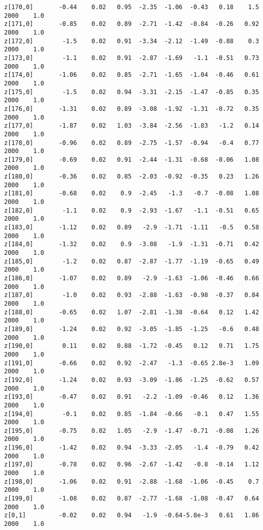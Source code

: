 \documentclass[11pt]{article}
\begin{document}
\begin{Verbatim}[commandchars=\\\{\}]
z[170,0]       -0.44    0.02   0.95  -2.35  -1.06  -0.43   0.18    1.5   2000    1.0
z[171,0]       -0.85    0.02   0.89  -2.71  -1.42  -0.84  -0.26   0.92   2000    1.0
z[172,0]        -1.5    0.02   0.91  -3.34  -2.12  -1.49  -0.88    0.3   2000    1.0
z[173,0]        -1.1    0.02   0.91  -2.87  -1.69   -1.1  -0.51   0.73   2000    1.0
z[174,0]       -1.06    0.02   0.85  -2.71  -1.65  -1.04  -0.46   0.61   2000    1.0
z[175,0]        -1.5    0.02   0.94  -3.31  -2.15  -1.47  -0.85   0.35   2000    1.0
z[176,0]       -1.31    0.02   0.89  -3.08  -1.92  -1.31  -0.72   0.35   2000    1.0
z[177,0]       -1.87    0.02   1.03  -3.84  -2.56  -1.83   -1.2   0.14   2000    1.0
z[178,0]       -0.96    0.02   0.89  -2.75  -1.57  -0.94   -0.4   0.77   2000    1.0
z[179,0]       -0.69    0.02   0.91  -2.44  -1.31  -0.68  -0.06   1.08   2000    1.0
z[180,0]       -0.36    0.02   0.85  -2.03  -0.92  -0.35   0.23   1.26   2000    1.0
z[181,0]       -0.68    0.02    0.9  -2.45   -1.3   -0.7  -0.08   1.08   2000    1.0
z[182,0]        -1.1    0.02    0.9  -2.93  -1.67   -1.1  -0.51   0.65   2000    1.0
z[183,0]       -1.12    0.02   0.89   -2.9  -1.71  -1.11   -0.5   0.58   2000    1.0
z[184,0]       -1.32    0.02    0.9  -3.08   -1.9  -1.31  -0.71   0.42   2000    1.0
z[185,0]        -1.2    0.02   0.87  -2.87  -1.77  -1.19  -0.65   0.49   2000    1.0
z[186,0]       -1.07    0.02   0.89   -2.9  -1.63  -1.06  -0.46   0.66   2000    1.0
z[187,0]        -1.0    0.02   0.93  -2.88  -1.63  -0.98  -0.37   0.84   2000    1.0
z[188,0]       -0.65    0.02   1.07  -2.81  -1.38  -0.64   0.12   1.42   2000    1.0
z[189,0]       -1.24    0.02   0.92  -3.05  -1.85  -1.25   -0.6   0.48   2000    1.0
z[190,0]        0.11    0.02   0.88  -1.72  -0.45   0.12   0.71   1.75   2000    1.0
z[191,0]       -0.66    0.02   0.92  -2.47   -1.3  -0.65 2.8e-3   1.09   2000    1.0
z[192,0]       -1.24    0.02   0.93  -3.09  -1.86  -1.25  -0.62   0.57   2000    1.0
z[193,0]       -0.47    0.02   0.91   -2.2  -1.09  -0.46   0.12   1.36   2000    1.0
z[194,0]        -0.1    0.02   0.85  -1.84  -0.66   -0.1   0.47   1.55   2000    1.0
z[195,0]       -0.75    0.02   1.05   -2.9  -1.47  -0.71  -0.08   1.26   2000    1.0
z[196,0]       -1.42    0.02   0.94  -3.33  -2.05   -1.4  -0.79   0.42   2000    1.0
z[197,0]       -0.78    0.02   0.96  -2.67  -1.42   -0.8  -0.14   1.12   2000    1.0
z[198,0]       -1.06    0.02   0.91  -2.88  -1.68  -1.06  -0.45    0.7   2000    1.0
z[199,0]       -1.08    0.02   0.87  -2.77  -1.68  -1.08  -0.47   0.64   2000    1.0
z[0,1]         -0.02    0.02   0.94   -1.9  -0.64-5.8e-3   0.61   1.86   2000    1.0

\end{Verbatim}
\end{document}
